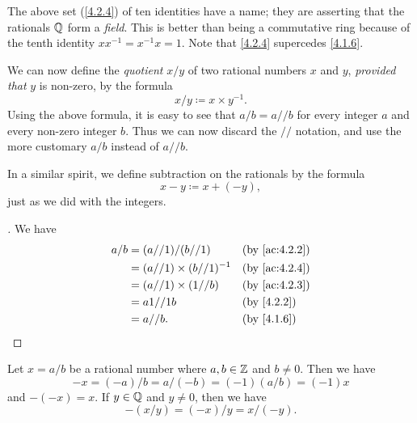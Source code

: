 \begin{rmk}\label{4.2.5}
  The above set (\cref{4.2.4}) of ten identities have a name;
  they are asserting that the rationals \(\mathbb{Q}\) form a \emph{field}.
  This is better than being a commutative ring because of the tenth identity \(xx^{-1} = x^{-1}x = 1\).
  Note that \cref{4.2.4} supercedes \cref{4.1.6}.
\end{rmk}

\begin{ac}\label{ac:4.2.4}
  We can now define the \emph{quotient} \(x / y\) of two rational numbers \(x\) and \(y\), \emph{provided that} \(y\) is non-zero, by the formula
  \[
    x / y \coloneqq x \times y^{-1}.
  \]
  Using the above formula, it is easy to see that \(a / b = a // b\) for every integer \(a\) and every non-zero integer \(b\).
  Thus we can now discard the \(//\) notation, and use the more customary \(a / b\) instead of \(a // b\).

  In a similar spirit, we define subtraction on the rationals by the formula
  \[
    x - y \coloneqq x + (-y),
  \]
  just as we did with the integers.
\end{ac}

\begin{proof}[]
  We have
  \begin{align*}
    a / b & = (a // 1) / (b // 1)           &  & \by{ac:4.2.2} \\
          & = (a // 1) \times (b // 1)^{-1} &  & \by{ac:4.2.4} \\
          & = (a // 1) \times (1 // b)      &  & \by{ac:4.2.3} \\
          & = a1 // 1b                      &  & \by{4.2.2}    \\
          & = a // b.                       &  & \by{4.1.6}
  \end{align*}
\end{proof}

\begin{ac}\label{ac:4.2.5}
  Let \(x = a / b\) be a rational number where \(a, b \in \mathbb{Z}\) and \(b \neq 0\).
  Then we have
  \[
    -x = (-a) / b = a / (-b) = (-1) (a / b) = (-1) x
  \]
  and \(-(-x) = x\).
  If \(y \in \mathbb{Q}\) and \(y \neq 0\), then we have
  \[
    -(x / y) = (-x) / y = x / (-y).
  \]
\end{ac}

